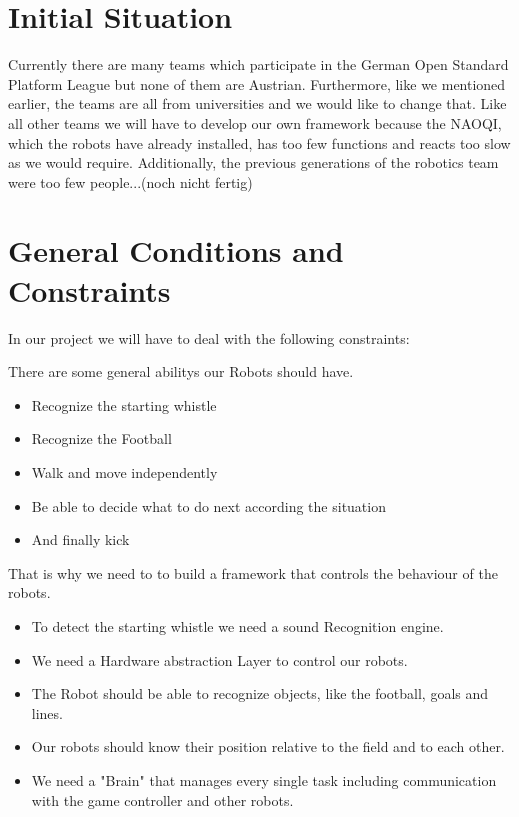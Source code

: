 \documentclass[12pt]{article}
\theoremstyle{definition}
\begin{document}
\pagebreak

\section{Initial Situation}


Currently there are many teams which participate in the German Open Standard Platform League but none of them are Austrian. Furthermore, like we mentioned earlier, the teams are all from universities and we would like to change that. Like all other teams we will have to develop our own framework because the NAOQI, which the robots have already installed, has too few functions and reacts too slow as we would require. Additionally, the previous generations of the robotics team were too few people...(noch nicht fertig)


\pagebreak

\section{General Conditions and Constraints}

In our project we will have to deal with the following constraints:

There are some general abilitys our Robots should have.
\begin{itemize}
	\item Recognize the starting whistle
	\item Recognize the Football
	\item Walk and move independently
	\item Be able to decide what to do next according the situation
	\item And finally kick 
\end{itemize}

That is why we need to to build a framework that controls the behaviour of the robots.

\begin{itemize}
\item To detect the starting whistle we need a sound Recognition engine.
\item We need a Hardware abstraction Layer to control our robots.
\item The Robot should be able to recognize objects, like the football, goals and lines.
\item Our robots should know their position relative to the field and to each other.
\item We need a "Brain" that manages every single task including communication with the game controller and other robots.

\end{itemize}
\end{document}
